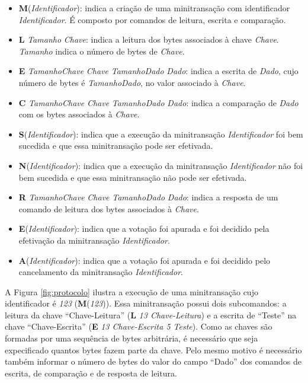 \documentclass[11pt,twoside,a4paper]{book}
\begin{document}
\begin{itemize}
\item \textbf{M}(\textit{Identificador}): indica a criação de uma minitransação com identificador \textit{Identificador}. É composto por comandos de leitura, escrita e comparação.

\item \textbf{L} \textit{Tamanho} \textit{Chave}: indica a leitura dos bytes associados à chave \textit{Chave}. \textit{Tamanho} indica o número de bytes de \textit{Chave}.

\item \textbf{E} \textit{TamanhoChave} \textit{Chave} \textit{TamanhoDado} \textit{Dado}: indica a escrita de \textit{Dado}, cujo número de bytes é \textit{TamanhoDado}, no valor associado à \textit{Chave}.

\item \textbf{C} \textit{TamanhoChave} \textit{Chave} \textit{TamanhoDado} \textit{Dado}: indica a comparação de \textit{Dado} com os bytes associados à \textit{Chave}.

\item \textbf{S}(\textit{Identificador}): indica que a execução da minitransação \textit{Identificador} foi bem sucedida e que essa minitransação pode ser efetivada.

\item \textbf{N}(\textit{Identificador}): indica que a execução da minitransação \textit{Identificador} não foi bem sucedida e que essa minitransação não pode ser efetivada. 

\item \textbf{R} \textit{TamanhoChave} \textit{Chave} \textit{TamanhoDado} \textit{Dado}: indica a resposta de um comando de leitura dos bytes associados à \textit{Chave}.

\item \textbf{E}(\textit{Identificador}): indica que a votação foi apurada e foi decidido pela efetivação da minitransação \textit{Identificador}.

\item \textbf{A}(\textit{Identificador}): indica que a votação foi apurada e foi decidido pelo cancelamento da minitransação \textit{Identificador}.

\end{itemize}

A Figura \ref{fig:protocolo} ilustra a execução de uma minitransação cujo identificador é \textit{123} (\textbf{M}(\textit{123})). Essa minitransação possui dois subcomandos: a leitura da chave ``Chave-Leitura'' (\textbf{L} \textit{13 Chave-Leitura}) e a escrita de ``Teste'' na chave ``Chave-Escrita'' (\textbf{E} \textit{13 Chave-Escrita 5 Teste}). Como as chaves são formadas por uma sequência de bytes arbitrária, é necessário que seja expecificado quantos bytes fazem parte da chave. Pelo mesmo motivo é necessário também informar o número de bytes do valor do campo ``Dado'' dos comandos de escrita, de comparação e de resposta de leitura.
\end{document}
